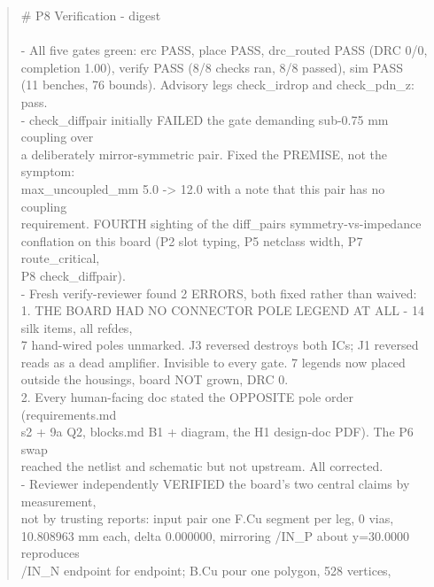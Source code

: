 \documentclass[11pt,a4paper]{article}
\begin{document}
\begin{quote}\small\ttfamily\raggedright
\# P8 Verification - digest\\
~\\
- All five gates green: erc PASS, place PASS, drc\_routed PASS (DRC 0/0,\\
  completion 1.00), verify PASS (8/8 checks ran, 8/8 passed), sim PASS\\
  (11 benches, 76 bounds). Advisory legs check\_irdrop and check\_pdn\_z: pass.\\
- check\_diffpair initially FAILED the gate demanding sub-0.75 mm coupling over\\
  a deliberately mirror-symmetric pair. Fixed the PREMISE, not the symptom:\\
  max\_uncoupled\_mm 5.0 -\textgreater{} 12.0 with a note that this pair has no coupling\\
  requirement. FOURTH sighting of the diff\_pairs symmetry-vs-impedance\\
  conflation on this board (P2 slot typing, P5 netclass width, P7 route\_critical,\\
  P8 check\_diffpair).\\
- Fresh verify-reviewer found 2 ERRORS, both fixed rather than waived:\\
  1. THE BOARD HAD NO CONNECTOR POLE LEGEND AT ALL - 14 silk items, all refdes,\\
     7 hand-wired poles unmarked. J3 reversed destroys both ICs; J1 reversed\\
     reads as a dead amplifier. Invisible to every gate. 7 legends now placed\\
     outside the housings, board NOT grown, DRC 0.\\
  2. Every human-facing doc stated the OPPOSITE pole order (requirements.md\\
     s2 + 9a Q2, blocks.md B1 + diagram, the H1 design-doc PDF). The P6 swap\\
     reached the netlist and schematic but not upstream. All corrected.\\
- Reviewer independently VERIFIED the board's two central claims by measurement,\\
  not by trusting reports: input pair one F.Cu segment per leg, 0 vias,\\
  10.808963 mm each, delta 0.000000, mirroring /IN\_P about y=30.0000 reproduces\\
  /IN\_N endpoint for endpoint; B.Cu pour one polygon, 528 vertices,\\

\end{quote}
\end{document}
